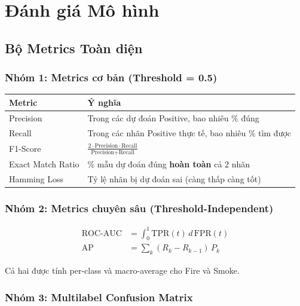 \documentclass[12pt,a4paper]{article}
\begin{document}
\section{Đánh giá Mô hình}

\subsection{Bộ Metrics Toàn diện}

\subsubsection{Nhóm 1: Metrics cơ bản (Threshold = 0.5)}

\begin{table}[h!]
\centering
\begin{tabular}{lp{8cm}}
\toprule
\textbf{Metric} & \textbf{Ý nghĩa} \\
\midrule
Precision & Trong các dự đoán Positive, bao nhiêu \% đúng \\
Recall    & Trong các nhãn Positive thực tế, bao nhiêu \% tìm được \\
F1-Score  & $\frac{2 \cdot \text{Precision} \cdot \text{Recall}}{\text{Precision}+\text{Recall}}$ \\
Exact Match Ratio & \% mẫu dự đoán đúng \textbf{hoàn toàn} cả 2 nhãn \\
Hamming Loss & Tỷ lệ nhãn bị dự đoán sai (càng thấp càng tốt) \\
\bottomrule
\end{tabular}
\end{table}

\subsubsection{Nhóm 2: Metrics chuyên sâu (Threshold-Independent)}

\begin{align}
  \text{ROC-AUC} &= \int_0^1 \text{TPR}(t)\, d\,\text{FPR}(t) \\
  \text{AP}      &= \sum_k (R_k - R_{k-1})\, P_k
\end{align}

Cả hai được tính per-class và macro-average cho Fire và Smoke.

\subsubsection{Nhóm 3: Multilabel Confusion Matrix}
\end{document}
